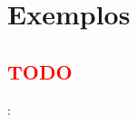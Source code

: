 
\section{Exemplos}


\subsection{\textcolor{red}{TODO}}


\begin{frame}{\insertsection: \insertsubsection}


\end{frame}

